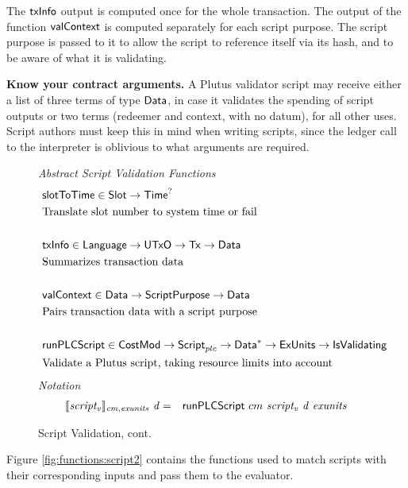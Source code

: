  The $\mathsf{txInfo}$ output is computed once for the whole transaction. The output of the function
  $\mathsf{valContext}$ is computed separately for each script purpose.
  The script purpose is passed to it
  to allow the script to reference itself via its hash, and to be aware of what it is validating.

\textbf{Know your contract arguments.}
  A Plutus validator script may receive either a list of three terms of type $\mathsf{Data}$, in case it validates the spending of script outputs
  or two terms (redeemer and context, with no datum), for all other uses.
  Script authors must keep this in mind when writing scripts, since the ledger call to the interpreter is oblivious to what
  arguments are required.

\begin{figure*}[htb]
  \emph{Abstract Script Validation Functions}
  \begin{align*}
     &\mathsf{slotToTime} \in \mathsf{Slot} \to \mathsf{Time}^? \\
     &\text{Translate slot number to system time or fail} \\~\\
     &\mathsf{txInfo} \in \mathsf{Language} \to \mathsf{UTxO} \to \mathsf{Tx} \to \mathsf{Data} \\
     &\text{Summarizes transaction data} \\~\\
     &\mathsf{valContext} \in \mathsf{Data} \to \mathsf{ScriptPurpose} \to \mathsf{Data} \\
     &\text{Pairs transaction data with a script purpose} \\~\\
     &\mathsf{runPLCScript} \in \mathsf{CostMod} \to\mathsf{Script}_{plc} \to
    \mathsf{Data}^{*} \to \mathsf{ExUnits} \to \mathsf{IsValidating} \\
     &\text{Validate a Plutus script, taking resource limits into account}
  \end{align*}
  \emph{Notation}
  \begin{align*}
    \llbracket \mathit{script_v} \rrbracket_{\mathit{cm},\mathit{exunits}}~\mathit{d}
    &=& \mathsf{runPLCScript} ~{cm}~\mathit{script_v}~\mathit{d}~\mathit{exunits}
  \end{align*}
  \caption{Script Validation, cont.}
  \label{fig:defs:functions-valid}
\end{figure*}

Figure \ref{fig:functions:script2} contains the functions used to
match scripts with their corresponding inputs and pass them to the
evaluator.

